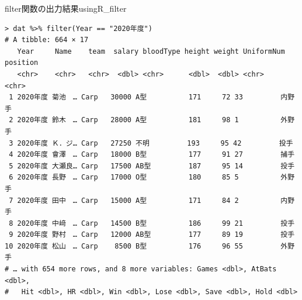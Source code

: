 \begin{Rscreen}{filter関数の出力結果}{usingR_filter}
	\begin{verbatim}
> dat %>% filter(Year == "2020年度")
# A tibble: 664 × 17
   Year     Name    team  salary bloodType height weight UniformNum position
   <chr>    <chr>   <chr>  <dbl> <chr>      <dbl>  <dbl> <chr>      <chr>   
 1 2020年度 菊池　… Carp   30000 A型          171     72 33         内野手  
 2 2020年度 鈴木　… Carp   28000 A型          181     98 1          外野手  
 3 2020年度 Ｋ．ジ… Carp   27250 不明         193     95 42         投手    
 4 2020年度 會澤　… Carp   18000 B型          177     91 27         捕手    
 5 2020年度 大瀬良… Carp   17500 AB型         187     95 14         投手    
 6 2020年度 長野　… Carp   17000 O型          180     85 5          外野手  
 7 2020年度 田中　… Carp   15000 A型          171     84 2          内野手  
 8 2020年度 中﨑　… Carp   14500 B型          186     99 21         投手    
 9 2020年度 野村　… Carp   12000 AB型         177     89 19         投手    
10 2020年度 松山　… Carp    8500 B型          176     96 55         外野手  
# … with 654 more rows, and 8 more variables: Games <dbl>, AtBats <dbl>,
#   Hit <dbl>, HR <dbl>, Win <dbl>, Lose <dbl>, Save <dbl>, Hold <dbl>
\end{verbatim}
\end{Rscreen}
